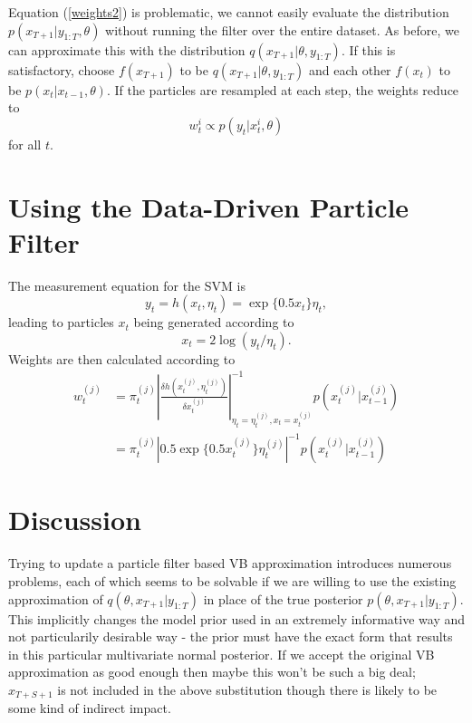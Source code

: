 \documentclass[12pt,a4paper]{article}%
\begin{document}
Equation (\ref{weights2}) is problematic, we cannot easily evaluate the distribution $p(x_{T+1} | y_{1:T}, \theta)$ without running the filter over the entire dataset. As before, we can approximate this with the distribution $q(x_{T+1} | \theta, y_{1:T})$. If this is satisfactory, choose $f(x_{T+1})$ to be $q(x_{T+1} | \theta, y_{1:T})$ and each other $f(x_{t})$ to be $p(x_t | x_{t-1}, \theta)$. If the particles are resampled at each step, the weights reduce to 
\begin{equation}
\label{weights6}
w_t^i \propto p(y_t | x_t^i, \theta)
\end{equation}
for all $t$.

\section{Using the Data-Driven Particle Filter}

The measurement equation for the SVM is
\begin{equation}
\label{measure}
y_t = h(x_t, \eta_t) =\exp\{0.5 x_t\} \eta_t,
\end{equation}
leading to particles $x_t$ being generated according to
\begin{equation}
\label{measureInv}
x_t = 2 \log(y_t / \eta_t).
\end{equation}
Weights are then calculated according to
\begin{align}
\label{DPFweight}
w_t^{(j)} &= \pi_t^{(j)} \left| \frac{\delta h(x_t^{(j)}, \eta_t^{(j)})}{\delta x_t^{(j)}} \right|^{-1}_{\eta_t = \eta_t^{(j)}, x_t = x_t^{(j)}} p\left(x_t^{(j)} | x_{t-1}^{(j)}\right) \nonumber \\
&= \pi_t^{(j)} \left| 0.5 \exp\{0.5 x_t^{(j)}\} \eta_t^{(j)} \right|^{-1} p \left(x_t^{(j)} | x_{t-1}^{(j)} \right)
\end{align}

\section{Discussion}

Trying to update a particle filter based VB approximation introduces numerous problems, each of which seems to be solvable if we are willing to use the existing approximation of $q(\theta, x_{T+1} | y_{1:T})$ in place of the true posterior $p(\theta, x_{T+1} | y_{1:T})$. This implicitly changes the model prior used in an extremely informative way and not particularily desirable way - the prior must have the exact form that results in this particular multivariate normal posterior.
If we accept the original VB approximation as good enough then maybe this won't be such a big deal; $x_{T+S+1}$ is not included in the above substitution though there is likely to be some kind of indirect impact. 
\end{document}
